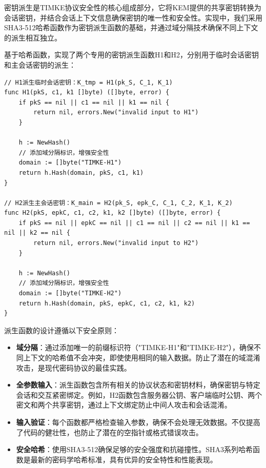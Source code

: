 密钥派生是TIMKE协议安全性的核心组成部分，它将KEM提供的共享密钥转换为会话密钥，并结合会话上下文信息确保密钥的唯一性和安全性。实现中，我们采用SHA3-512哈希函数作为密钥派生函数的基础，并通过域分隔技术确保不同上下文的派生相互独立。

基于哈希函数，实现了两个专用的密钥派生函数H1和H2，分别用于临时会话密钥和主会话密钥的派生：

\begin{listing}[ht]
\begin{verbatim}
// H1派生临时会话密钥：K_tmp = H1(pk_S, C_1, K_1)
func H1(pkS, c1, k1 []byte) ([]byte, error) {
    if pkS == nil || c1 == nil || k1 == nil {
        return nil, errors.New("invalid input to H1")
    }

    h := NewHash()
    // 添加域分隔标识，增强安全性
    domain := []byte("TIMKE-H1")
    return h.Hash(domain, pkS, c1, k1)
}

// H2派生主会话密钥：K_main = H2(pk_S, epk_C, C_1, C_2, K_1, K_2)
func H2(pkS, epkC, c1, c2, k1, k2 []byte) ([]byte, error) {
    if pkS == nil || epkC == nil || c1 == nil || c2 == nil || k1 == nil || k2 == nil {
        return nil, errors.New("invalid input to H2")
    }

    h := NewHash()
    // 添加域分隔标识，增强安全性
    domain := []byte("TIMKE-H2")
    return h.Hash(domain, pkS, epkC, c1, c2, k1, k2)
}
\end{verbatim}
\caption{密钥派生函数代码}
\label{code:key-derivation}
\end{listing}

派生函数的设计遵循以下安全原则：
\begin{itemize}
    \item \textbf{域分隔}：通过添加唯一的前缀标识符（"TIMKE-H1"和"TIMKE-H2"），确保不同上下文的哈希值不会冲突，即使使用相同的输入数据。防止了潜在的域混淆攻击，是现代密码协议的最佳实践。
    \item \textbf{全参数输入}：派生函数包含所有相关的协议状态和密钥材料，确保密钥与特定会话和交互紧密绑定。例如，H2函数包含服务器公钥、客户端临时公钥、两个密文和两个共享密钥，通过上下文绑定防止中间人攻击和会话混淆。
    \item \textbf{输入验证}：每个函数都严格检查输入参数，确保不会处理无效数据。不仅提高了代码的健壮性，也防止了潜在的空指针或格式错误攻击。
    \item \textbf{安全哈希}：使用SHA3-512确保足够的安全强度和抗碰撞性。SHA3系列哈希函数是最新的密码学哈希标准，具有优异的安全特性和性能表现。
\end{itemize}

